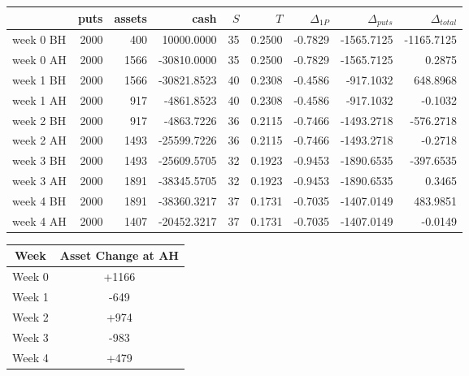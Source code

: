 \documentclass{article}
\begin{document}
\begin{tabular}{lrrrrrrrr}
    \toprule
              & puts & assets & cash        & $S$ & $T$    & $\Delta_{1P}$ & $\Delta_{puts}$ & $\Delta_{total}$ \\
    \midrule
    week 0 BH & 2000 & 400    & 10000.0000  & 35  & 0.2500 & -0.7829       & -1565.7125      & -1165.7125       \\
    week 0 AH & 2000 & 1566   & -30810.0000 & 35  & 0.2500 & -0.7829       & -1565.7125      & 0.2875           \\
    week 1 BH & 2000 & 1566   & -30821.8523 & 40  & 0.2308 & -0.4586       & -917.1032       & 648.8968         \\
    week 1 AH & 2000 & 917    & -4861.8523  & 40  & 0.2308 & -0.4586       & -917.1032       & -0.1032          \\
    week 2 BH & 2000 & 917    & -4863.7226  & 36  & 0.2115 & -0.7466       & -1493.2718      & -576.2718        \\
    week 2 AH & 2000 & 1493   & -25599.7226 & 36  & 0.2115 & -0.7466       & -1493.2718      & -0.2718          \\
    week 3 BH & 2000 & 1493   & -25609.5705 & 32  & 0.1923 & -0.9453       & -1890.6535      & -397.6535        \\
    week 3 AH & 2000 & 1891   & -38345.5705 & 32  & 0.1923 & -0.9453       & -1890.6535      & 0.3465           \\
    week 4 BH & 2000 & 1891   & -38360.3217 & 37  & 0.1731 & -0.7035       & -1407.0149      & 483.9851         \\
    week 4 AH & 2000 & 1407   & -20452.3217 & 37  & 0.1731 & -0.7035       & -1407.0149      & -0.0149          \\
    \bottomrule
\end{tabular}

\begin{tabular}{|c|c|}
    \hline
    \textbf{Week} & \textbf{Asset Change at AH} \\
    \hline
    Week 0        & +1166                       \\
    Week 1        & -649                        \\
    Week 2        & +974                        \\
    Week 3        & -983                        \\
    Week 4        & +479                        \\
    \hline
\end{tabular}
\end{document}
